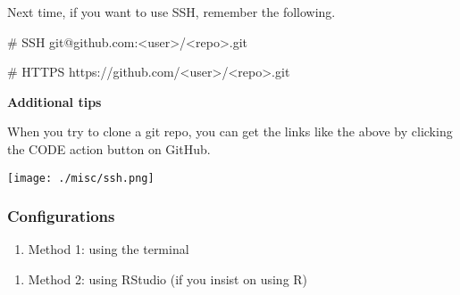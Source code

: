 \documentclass[
  letterpaper,
  DIV=11,
  numbers=noendperiod]{scrreprt}
\newenvironment{Shaded}{\begin{snugshade}}{\end{snugshade}}
\newcommand{\AttributeTok}[1]{\textcolor[rgb]{0.40,0.45,0.13}{#1}}
\newcommand{\CommentTok}[1]{\textcolor[rgb]{0.37,0.37,0.37}{#1}}
\newcommand{\ExtensionTok}[1]{\textcolor[rgb]{0.00,0.23,0.31}{#1}}
\newcommand{\NormalTok}[1]{\textcolor[rgb]{0.00,0.23,0.31}{#1}}
\newcommand{\OperatorTok}[1]{\textcolor[rgb]{0.37,0.37,0.37}{#1}}
\newcommand{\StringTok}[1]{\textcolor[rgb]{0.13,0.47,0.30}{#1}}
\providecommand{\tightlist}{%
  \setlength{\itemsep}{0pt}\setlength{\parskip}{0pt}}\usepackage{longtable,booktabs,array}
\begin{document}
Next time, if you want to use SSH, remember the following.

\begin{Shaded}
\begin{Highlighting}[]
\CommentTok{\# SSH}
\ExtensionTok{git@github.com:}\OperatorTok{\textless{}}\NormalTok{user}\OperatorTok{\textgreater{}}\NormalTok{/}\OperatorTok{\textless{}}\NormalTok{repo}\OperatorTok{\textgreater{}}\NormalTok{.git}

\CommentTok{\# HTTPS}
\ExtensionTok{https://github.com/}\OperatorTok{\textless{}}\NormalTok{user}\OperatorTok{\textgreater{}}\NormalTok{/}\OperatorTok{\textless{}}\NormalTok{repo}\OperatorTok{\textgreater{}}\NormalTok{.git}
\end{Highlighting}
\end{Shaded}

\textbf{Additional tips}

When you try to clone a git repo, you can get the links like the above
by clicking the CODE action button on GitHub.

\texttt{[image: ./misc/ssh.png]}

\hypertarget{configurations}{%
\subsubsection*{Configurations}\label{configurations}}

\begin{enumerate}
\def\labelenumi{\arabic{enumi}.}
\tightlist
\item
  Method 1: using the terminal
\end{enumerate}

\begin{Shaded}
\end{Shaded}

\begin{enumerate}
\def\labelenumi{\arabic{enumi}.}
\setcounter{enumi}{1}
\tightlist
\item
  Method 2: using RStudio (if you insist on using R)
\end{enumerate}
\end{document}
